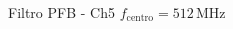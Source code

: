 \documentclass[ignorenonframetext,12pt]{beamer}
\begin{document}
\begin{frame}{Filtro PFB - Ch5 $f_\text{centro}= 512\,\text{MHz}$}
        \begin{center}
        \end{center}
        \vspace{-1.2cm}
        \begin{center}
        \end{center}
        \vspace{-1.8cm}
        \begin{columns}
                \begin{column}{0.5\textwidth}
        \begin{center}

\end{center}
\end{column}
\end{columns}
\end{frame}
\end{document}
